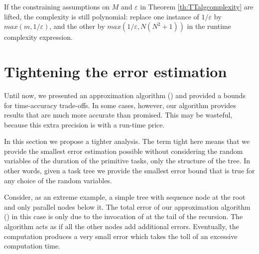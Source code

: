 \documentclass{article}
\begin{document}
If the constraining assumptions on $M$ and $\varepsilon$ in Theorem \ref{th:TTalgcomplexity} are lifted, the complexity is still polynomial:
replace one instance of $1/\varepsilon$ by $max(m,1/\varepsilon)$, and the other by $max(1/\varepsilon,N (N^2+1))$
in the runtime complexity expression.

\section{Tightening the error estimation}\label{Chap:Bound}

Until now, we presented an approximation algorithm (\Network) and provided a bounds for time-accuracy trade-offs. In some cases, however, our algorithm provides results that are much more accurate than promised. This may be wasteful, because this extra precision is with a run-time price.

In this section we propose a tighter analysis. The term tight here means 
that we provide the smallest error estimation possible without considering the random variables of 
the duration of the primitive tasks, only the structure of the tree. 
In other words, given a task tree we provide the smallest error bound that is true for any choice 
of the random variables.


Consider, as an extreme example, a simple tree with sequence node at the root and only parallel nodes below it. The total error of our approximation algorithm (\Network) in this case is only due to the invocation of \Sequence at the tail of the recursion. The \Network algorithm acts as if all the other nodes add additional errors. Eventually, the \Sequence
computation produces a very small error which takes the toll of an excessive computation time.
\end{document}
